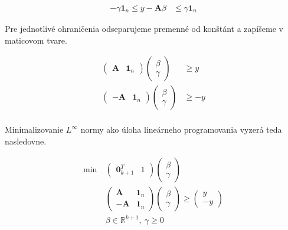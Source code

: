 \documentclass[report.tex]{subfiles}
\begin{document}
\begin{align*}
	-\gamma \mathbf{1}_n \leq y - \mathbf{A} \beta &\leq \gamma \mathbf{1}_n
\end{align*}

Pre jednotlivé ohraničenia odseparujeme premenné od konštánt a zapíšeme v maticovom tvare.

\begin{align*}
	\left(
		\begin{array}{c|c}
			\mathbf{A} & \mathbf{1}_n
		\end{array}
	\right)
	\left(
		\begin{array}{c}
			\beta \\
			\hline
			\gamma
		\end{array}
	\right) & \geq y \\
	\left(
		\begin{array}{c|c}
			-\mathbf{A} & \mathbf{1}_n
		\end{array}
	\right)
	\left(
		\begin{array}{c}
			\beta \\
			\hline
			\gamma
		\end{array}
	\right) &\geq -y \\
\end{align*}


Minimalizovanie $L^{\infty}$ normy ako úloha lineárneho programovania vyzerá teda nasledovne.

\begin{align}
	\text{min}~ &
	\left(
		\begin{array}{c|c}
			\mathbf{0}_{k+1}^T & 1
		\end{array}
	\right)
	\left(
		\begin{array}{c}
			\beta \\
			\hline
			\gamma
		\end{array}
	\right) \nonumber \\
	&\left(
		\begin{array}{c|c}
			\mathbf{A} & \mathbf{1}_n \\
			\hline
			-\mathbf{A} & \mathbf{1}_n
		\end{array}
	\right)
	\left(
		\begin{array}{c}
			\beta \\
			\hline
			\gamma
		\end{array}
	\right)
	\geq
	\left(
		\begin{array}{c}
			y \\
			\hline
			-y
		\end{array}
	\right) \label{Pinf}\\
	&\beta \in \mathbb{R}^{k+1},~\gamma \geq 0 \nonumber
\end{align}
\end{document}
